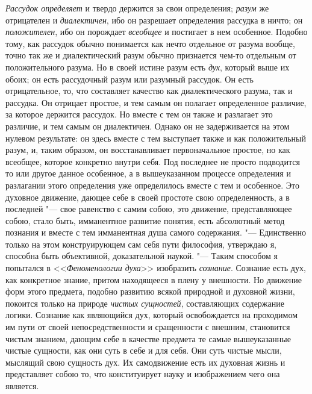 {\em Рассудок определяет} и твердо держится за свои
определения; {\em разум} же отрицателен и
{\em диалектичен}, ибо он разрешает определения
рассудка в ничто; он {\em положителен}, ибо он
порождает {\em всеобщее} и постигает в нем особенное.
Подобно тому, как рассудок обычно понимается как нечто отдельное от разума
вообще, точно так же и диалектический разум обычно признается чем-то
отдельным от положительного разума. Но в своей истине разум есть
{\em дух}, который выше их обоих; он есть рассудочный
разум или разумный рассудок. Он есть отрицательное, то, что составляет
качество как диалектического разума, так и рассудка. Он отрицает простое, и
тем самым он полагает определенное различие, за которое держится рассудок.
Но вместе с тем он также и разлагает это различие, и тем самым он
диалектичен. Однако он не задерживается на этом нулевом результате: он
здесь вместе с тем выступает также и как положительный разум, и, таким
образом, он восстанавливает первоначальное простое, но как всеобщее,
которое конкретно внутри себя. Под последнее не просто подводится то или
другое данное особенное, а в вышеуказанном процессе определения и
разлагании этого определения уже определилось вместе с тем и особенное. Это
духовное движение, дающее себе в своей простоте свою определенность, а в
последней "--- свое равенство с самим собою, это движение, представляющее
собою, стало быть, имманентное развитие понятия, есть абсолютный метод
познания и вместе с тем имманентная душа самого содержания. "--- Единственно
только на этом конструирующем сам себя пути философия, утверждаю я,
способна быть объективной, доказательной наукой. "--- Таким способом я
попытался в <<{\em Феноменологии духа}>> изобразить
{\em сознание}. Сознание есть дух, как конкретное
знание, притом находящееся в плену у внешности. Но движение форм этого
предмета, подобно развитию всякой природной и духовной жизни, покоится
только на природе {\em чистых сущностей}, составляющих
содержание логики. Сознание как являющийся дух, который освобождается на
проходимом им пути от своей непосредственности и сращенности с внешним,
становится чистым знанием, дающим себе в качестве предмета те самые
вышеуказанные чистые сущности, как они суть в себе и для себя. Они суть
чистые мысли, мыслящий свою сущность дух. Их самодвижение есть их духовная
жизнь и представляет собою то, что конституирует науку и изображением чего
она является.

